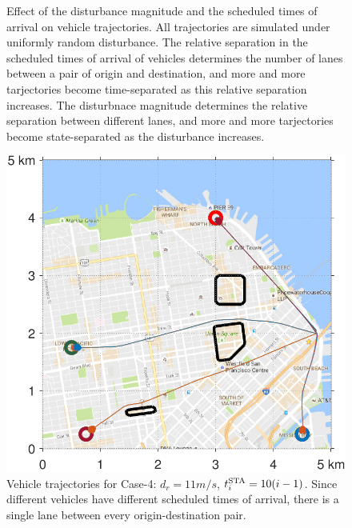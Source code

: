 \begin{figure}[!htb]
\begin{subfigure}{0.5\textwidth}
  \label{fig:sf_d11sep5}
\end{subfigure}%
\caption{Effect of the disturbance magnitude and the scheduled times of arrival on vehicle trajectories. All trajectories are simulated under uniformly random disturbance. The relative separation in the scheduled times of arrival of vehicles determines the number of lanes between a pair of origin and destination, and more and more tarjectories become time-separated as this relative separation increases. The disturbnace magnitude determines the relative separation between different lanes, and more and more tarjectories become state-separated as the disturbance increases. }
\label{fig:trajectories_sf}
\end{figure}

\begin{figure}[t]
  \centering
  \includegraphics[width=\columnwidth]{figs/sf_d11sep10}
  \caption{Vehicle trajectories for Case-4: $d_r = 11m/s$, $t^\text{STA}_i = 10(i-1)$. Since different vehicles have different scheduled times of arrival, there is a single lane between every origin-destination pair.} 
  \label{fig:sf_d11sep10}
\end{figure}